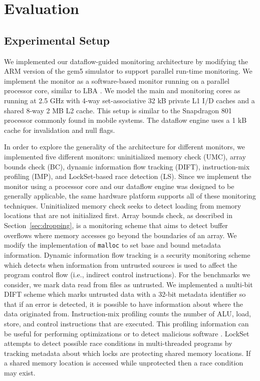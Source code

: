 \section{Evaluation}
\label{sec:evaluation}

\subsection{Experimental Setup}
\label{sec:evaluation.setup}

We implemented our dataflow-guided monitoring architecture by
modifying the ARM version of the gem5 simulator \cite{gem5} to support parallel
run-time monitoring. We implement the monitor as a software-based monitor
running on a parallel processor core, similar to LBA \cite{lba-asid06}.
We model the main and monitoring cores as
running at 2.5
GHz with 4-way set-associative 32 kB private L1 I/D caches and a shared 8-way 2 MB L2
cache. This setup is similar to the Snapdragon 801 processor commonly found in
mobile systems. The dataflow engine uses a 1 kB cache for invalidation and null flags.

In order to explore the generality of the architecture for
different monitors, we implemented five different monitors: uninitialized
memory check (UMC), array bounds check (BC), dynamic information flow
tracking (DIFT), instruction-mix profiling (IMP), and LockSet-based race
detection (LS).  
Since we implement the monitor using a
processor core and our dataflow engine was designed to be generally applicable,
the same hardware platform supports all of these monitoring techniques.
Uninitialized memory
check seeks to detect loading from
memory locations that are not initialized first. Array bounds check, as
described in Section~\ref{sec:dropping}, is a monitoring scheme that aims to
detect buffer overflows where memory accesses go beyond the boundaries of an
array. We modify the implementation of {\tt malloc} to set base and bound
metadata information. Dynamic information flow tracking is a security
monitoring scheme
which detects when information from untrusted sources is used to affect the
program control flow (i.e., indirect control instructions). For the benchmarks we consider, we mark data read from
files as untrusted. We implemented a multi-bit DIFT scheme which marks
untrusted data with a 32-bit metadata identifier so
that if an error is detected, it is possible to have information about where
the data originated from. Instruction-mix profiling counts the number of ALU,
load, store, and control instructions that are executed. This profiling
information can be useful for performing optimizations or to detect malicious
software \cite{tang-raid14}.
LockSet \cite{eraser-tocs97} attempts to detect possible race conditions in multi-threaded programs
by tracking metadata about which locks are protecting shared memory
locations. If a shared memory location is accessed while unprotected
then a race condition may exist.

